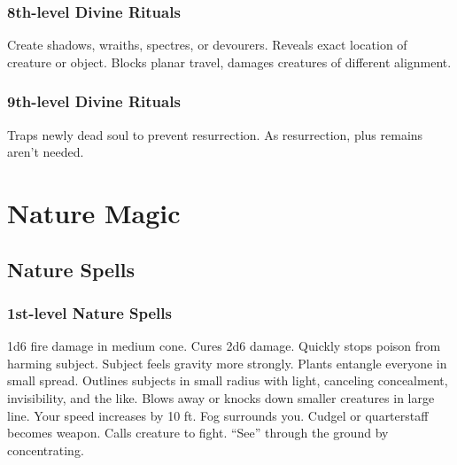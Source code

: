 \subsubsection{8th-level Divine Rituals}
\begin{rituallist}
     Create shadows, wraiths, spectres, or devourers.
     Reveals exact location of creature or object.
     Blocks planar travel, damages creatures of different alignment.
\end{rituallist}

\subsubsection{9th-level Divine Rituals}
\begin{rituallist}
    \F Traps newly dead soul to prevent resurrection.
     As resurrection, plus remains aren't needed.
\end{rituallist}

\section{Nature Magic}\label{Nature Magic}
\subsection{Nature Spells}\label{Nature Spells}

\subsubsection{1st-level Nature Spells}
\begin{spelllist}
   1d6 fire damage in medium cone.
   Cures 2d6 damage.
   Quickly stops poison from harming subject.
   Subject feels gravity more strongly.
   Plants entangle everyone in small spread.
   Outlines subjects in small radius with light, canceling concealment, invisibility, and the like.
   Blows away or knocks down smaller creatures in large line.
   Your speed increases by 10 ft.
   Fog surrounds you.
   Cudgel or quarterstaff becomes  weapon.
   Calls creature to fight.
   ``See'' through the ground by concentrating.
\end{spelllist}

